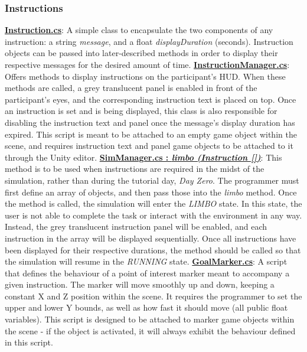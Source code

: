 \documentclass{article}
\begin{document}
\subsubsection{Instructions} 
\href{https://bit.ly/2JFHEED}{\textbf{Instruction.cs}}: A simple class to encapsulate the two components of any instruction: a string \textit{message}, and a float \textit{displayDuration} (seconds). Instruction objects can be passed into later-described methods in order to display their respective messages for the desired amount of time. \newline \newline
\href{https://bit.ly/2TzLE9i}{\textbf{InstructionManager.cs}}: Offers methods to display instructions on the participant's HUD. When these methods are called, a grey translucent panel is enabled in front of the participant's eyes, and the corresponding instruction text is placed on top. Once an instruction is set and is being displayed, this class is also responsible for disabling the instruction text and panel once the message's display duration has expired. This script is meant to be attached to an empty game object within the scene, and requires instruction text and panel game objects to be attached to it through the Unity editor. \newline \newline
\href{https://bit.ly/2UhmSzq}{\textbf{SimManager.cs : \textit{limbo (Instruction [])}}}: This method is to be used when instructions are required in the midst of the simulation, rather than during the tutorial day, \textit{Day Zero}. The programmer must first define an array of  objects, and then pass those into the \textit{limbo} method. Once the method is called, the simulation will enter the \textit{LIMBO} state. In this state, the user is not able to complete the task or interact with the environment in any way. Instead, the grey translucent instruction panel will be enabled, and each instruction in the array will be displayed sequentially. Once all instructions have been displayed for their respective durations, the  method should be called so that the simulation will resume in the \textit{RUNNING} state. \newline \newline
\href{https://bit.ly/2Yooc2m}{\textbf{GoalMarker.cs}}: A script that defines the behaviour of a point of interest marker meant to accompany a given instruction. The marker will move smoothly up and down, keeping a constant X and Z position within the scene. It requires the programmer to set the upper and lower Y bounds, as well as how fast it should move (all public float variables). This script is designed to be attached to marker game objects within the scene - if the object is activated, it will always exhibit the behaviour defined in this script. \newline \newline
\end{document}
